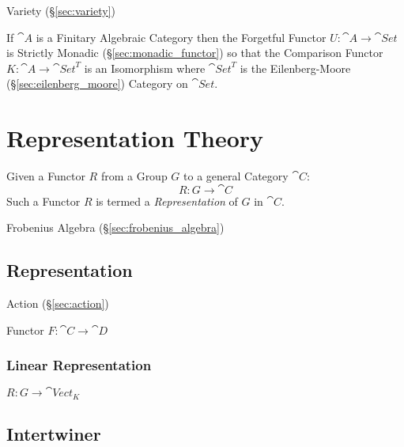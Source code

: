 Variety (\S\ref{sec:variety})

If $\cat{A}$ is a Finitary Algebraic Category then the Forgetful
Functor $U : \cat{A} \rightarrow \cat{Set}$ is Strictly Monadic
(\S\ref{sec:monadic_functor}) so that the Comparison Functor $K :
\cat{A} \rightarrow \cat{Set}^T$ is an Isomorphism where
$\cat{Set}^T$ is the Eilenberg-Moore (\S\ref{sec:eilenberg_moore})
Category on $\cat{Set}$.




\section{Representation Theory}\label{sec:representation_theory}

Given a Functor $R$ from a Group $G$ to a general Category
$\cat{C}$:
\[
    R : G \rightarrow \cat{C}
\]
Such a Functor $R$ is termed a \emph{Representation} of $G$ in
$\cat{C}$.

Frobenius Algebra (\S\ref{sec:frobenius_algebra})



\subsection{Representation}\label{sec:representation}

Action (\S\ref{sec:action})

Functor $F : \cat{C} \rightarrow \cat{D}$



\subsubsection{Linear Representation}\label{sec:linear_representation}

$R : G \rightarrow \cat{Vect}_K$



\subsection{Intertwiner}\label{sec:intertwiner}

